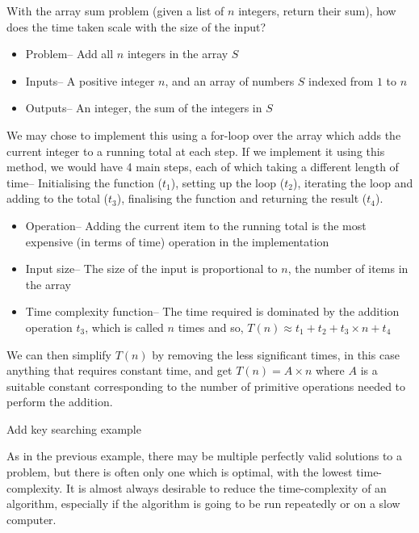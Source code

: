 \begin{example*}{}{}
  With the array sum problem (given a list of $n$ integers, return their sum), how does the time taken scale with the
   size of the input?

  \begin{itemize}
    \item Problem-- Add all $n$ integers in the array $S$
    \item Inputs-- A positive integer $n$, and an array of numbers $S$ indexed from $1$ to $n$
    \item Outputs-- An integer, the sum of the integers in $S$
  \end{itemize}

  We may chose to implement this using a for-loop over the array which adds the current integer to a running total at
   each step. If we implement it using this method, we would have 4 main steps, each of which taking a different length
   of time-- Initialising the function ($t_1$), setting up the loop ($t_2$), iterating the loop and adding to the total
   ($t_3$), finalising the function and returning the result ($t_4$).

  \begin{itemize}
    \item Operation-- Adding the current item to the running total is the most expensive (in terms of time) operation
     in the implementation
    \item Input size-- The size of the input is proportional to $n$, the number of items in the array
    \item Time complexity function-- The time required is dominated by the addition operation $t_3$, which is called
     $n$ times and so, $T(n) \approx t_1 + t_2 + t_3 \times n + t_4$
  \end{itemize}

  We can then simplify $T(n)$ by removing the less significant times, in this case anything that requires constant time,
   and get $T(n) = A \times n$ where $A$ is a suitable constant corresponding to the number of primitive operations
   needed to perform the addition.
\end{example*}

\begin{example*}{}{}
  \huge Add key searching example
\end{example*}

As in the previous example, there may be multiple perfectly valid solutions to a problem, but there is often only one
 which is optimal, with the lowest time-complexity. It is almost always desirable to reduce the time-complexity of an
 algorithm, especially if the algorithm is going to be run repeatedly or on a slow computer.

